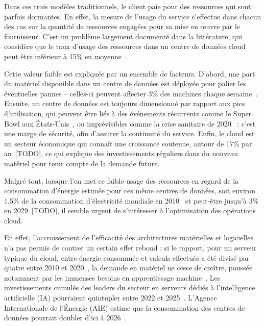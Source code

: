 Dans ces trois modèles traditionnels, le client paie pour des ressources qui sont parfois dormantes. En effet, la mesure de l'usage du service s'effectue dans chacun des cas sur la quantité de ressources engagées pour sa mise en œuvre par le fournisseur. C'est un problème largement documenté dans la littérature, qui considère que le taux d'usage des ressources dans un centre de données cloud peut être inférieur à 15\% en moyenne~\cite{vasanWorthTheirWatts2010, vermaLargescaleClusterManagement2015a}.

Cette valeur faible est expliquée par un ensemble de facteurs. D'abord, une part du matériel disponible dans un centre de données est déployée pour palier les éventuelles pannes -- celles-ci peuvent affecter 3\% des machines chaque semaine~\cite{BareMetal70B}. Ensuite, un centre de données est toujours dimensionné par rapport aux pics d'utilisation, qui peuvent être liés à des événements récurrents comme le Super Bowl aux États-Unis~\cite{wangTouchdownCloudImpact2019}, ou imprévisibles comme la crise sanitaire de 2020~\cite{alashhabImpactCoronavirusPandemic2021} : c'est une marge de sécurité, afin d'assurer la continuité du service. Enfin, le cloud est un secteur économique qui connaît une croissance soutenue, autour de 17\% par an~[TODO], ce qui explique des investissements réguliers dans du nouveau matériel pour tenir compte de la demande future.

Malgré tout, lorsque l'on met ce faible usage des ressources en regard de la consommation d'énergie estimée pour ces même centres de données, soit environ 1,5\% de la consommation d'électricité mondiale en 2010~\cite{masanetRecalibratingGlobalData2020} et peut-être jusqu'à 3\% en 2029~[TODO], il semble urgent de s'intéresser à l'optimisation des opérations cloud.

En effet, l'accroissement de l'efficacité des architectures matérielles et logicielles n'a pas permis de contrer un certain effet rebond : si le rapport, pour un serveur typique du cloud, entre énergie consommée et calculs effectués a été divisé par quatre entre 2010 et 2020~\cite{masanetRecalibratingGlobalData2020}, la demande en matériel ne cesse de croître, poussée notamment par les immenses besoins en apprentissage machine~\cite{commentMetaOperate6002024}. Les investissements cumulés des leaders du secteur en serveurs dédiés à l'intelligence artificielle (IA) pourraient quintupler entre 2022 et 2025~\cite{DerriereIADeferlante2024, elderNextWaveAI2024}. L'Agence Internationale de l'Énergie (AIE) estime que la consommation des centres de données pourrait doubler d'ici à 2026~\cite{Electricity2024Analysis2024}.

